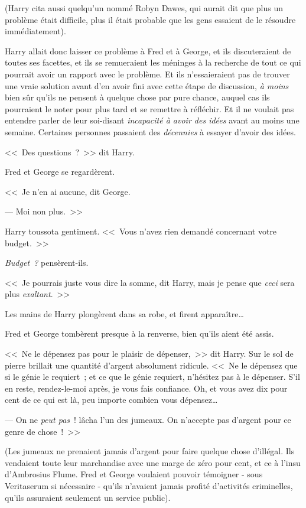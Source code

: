 (Harry cita aussi quelqu'un nommé Robyn Dawes, qui aurait dit que plus un problème était difficile, plus il était probable que les gens essaient de le résoudre immédiatement).

Harry allait donc laisser ce problème à Fred et à George, et ils discuteraient de toutes ses facettes, et ils se remueraient les méninges à la recherche de tout ce qui pourrait avoir un rapport avec le problème. Et ils n'essaieraient pas de trouver une vraie solution avant d'en avoir fini avec cette étape de discussion, \emph{à moins} bien sûr qu'ils ne pensent à quelque chose par pure chance, auquel cas ils pourraient le noter pour plus tard et se remettre à réfléchir. Et il ne voulait pas entendre parler de leur soi-disant \emph{incapacité à avoir des idées} avant au moins une semaine. Certaines personnes passaient des \emph{décennies} à essayer d'avoir des idées.

<<~Des questions~?~>> dit Harry.

Fred et George se regardèrent.

<<~Je n'en ai aucune, dit George.

--- Moi non plus.~>>

Harry toussota gentiment. <<~Vous n'avez rien demandé concernant votre budget.~>>

\emph{Budget~?} pensèrent-ils.

<<~Je pourrais juste vous dire la somme, dit Harry, mais je pense que \emph{ceci} sera plus \emph{exaltant}.~>>

Les mains de Harry plongèrent dans sa robe, et firent apparaître…

Fred et George tombèrent presque à la renverse, bien qu'ils aient été assis.

<<~Ne le dépensez pas pour le plaisir de dépenser,~>> dit Harry. Sur le sol de pierre brillait une quantité d'argent absolument ridicule. <<~Ne le dépensez que si le génie le requiert~; et ce que le génie requiert, n'hésitez pas à le dépenser. S'il en reste, rendez-le-moi après, je vous fais confiance. Oh, et vous avez dix pour cent de ce qui est là, peu importe combien vous dépensez…

--- On ne \emph{peut pas}~! lâcha l'un des jumeaux. On n'accepte pas d'argent pour ce genre de chose~!~>>

(Les jumeaux ne prenaient jamais d'argent pour faire quelque chose d'illégal. Ils vendaient toute leur marchandise avec une marge de zéro pour cent, et ce à l'insu d'Ambrosius Flume. Fred et George voulaient pouvoir témoigner - sous Veritaserum si nécessaire - qu'ils n'avaient jamais profité d'activités criminelles, qu'ils assuraient seulement un service public).

